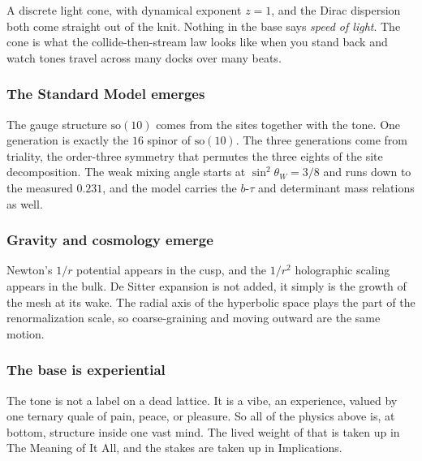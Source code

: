 A discrete light cone, with dynamical exponent $z = 1$, and the Dirac dispersion both come straight out of the knit. Nothing in the base says \emph{speed of light}. The cone is what the collide-then-stream law looks like when you stand back and watch tones travel across many docks over many beats.

\subsubsection{The Standard Model emerges}

The gauge structure $\mathrm{so}(10)$ comes from the sites together with the tone. One generation is exactly the $16$ spinor of $\mathrm{so}(10)$. The three generations come from triality, the order-three symmetry that permutes the three eights of the site decomposition. The weak mixing angle starts at $\sin^2\theta_W = 3/8$ and runs down to the measured $0.231$, and the model carries the $b$-$\tau$ and determinant mass relations as well.

\subsubsection{Gravity and cosmology emerge}

Newton's $1/r$ potential appears in the cusp, and the $1/r^2$ holographic scaling appears in the bulk. De Sitter expansion is not added, it simply is the growth of the mesh at its wake. The radial axis of the hyperbolic space plays the part of the renormalization scale, so coarse-graining and moving outward are the same motion.

\subsubsection{The base is experiential}

The tone is not a label on a dead lattice. It is a vibe, an experience, valued by one ternary quale of pain, peace, or pleasure. So all of the physics above is, at bottom, structure inside one vast mind. The lived weight of that is taken up in The Meaning of It All, and the stakes are taken up in Implications.

